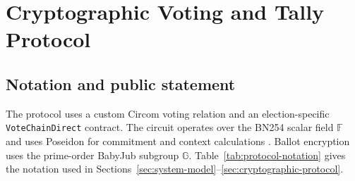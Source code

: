 \section{Cryptographic Voting and Tally Protocol}
\label{sec:05}
\label{sec:cryptographic-protocol}

\subsection{Notation and public statement}
\label{subsec:protocol-notation}

The protocol uses a custom Circom voting relation and an election-specific
\texttt{VoteChainDirect} contract. The circuit operates over the BN254
scalar field $\mathbb{F}$ and uses Poseidon for commitment and context calculations
\citep{grassi2021poseidon}. Ballot encryption uses the prime-order BabyJub
subgroup $\mathbb{G}$. Table~\ref{tab:protocol-notation} gives the notation used in
Sections~\ref{sec:system-model}--\ref{sec:cryptographic-protocol}.

